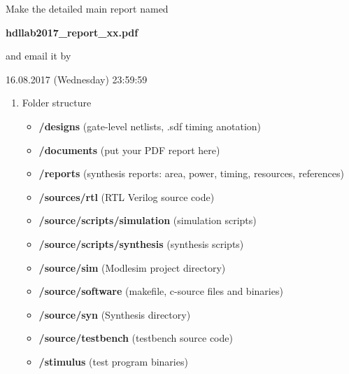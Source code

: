 Make the detailed main report named 
\begin{center}
\textbf{hdllab2017\_report\_xx.pdf}
\end{center}
 and email it by 
\begin{center}

16.08.2017 (Wednesday) 23:59:59
\end{center}
\begin{enumerate}
	\item Folder structure
	\begin{itemize}
	    \item \textbf{/designs}		(gate-level netlists, .sdf timing anotation)
		\item \textbf{/documents}					(put your PDF report here)
		\item \textbf{/reports}						(synthesis reports: area, power, timing, resources, references)
		\item \textbf{/sources/rtl}					(RTL Verilog source code)
		\item \textbf{/source/scripts/simulation}			(simulation scripts)
		\item \textbf{/source/scripts/synthesis}			(synthesis scripts)
		\item \textbf{/source/sim}			       (Modlesim project directory)
		\item \textbf{/source/software}				(makefile, c-source files and binaries)
		\item \textbf{/source/syn}			       (Synthesis directory)
		\item \textbf{/source/testbench} 		   (testbench source code)
		\item \textbf{/stimulus}					(test program binaries)
		\end{itemize}
	

\end{enumerate}
